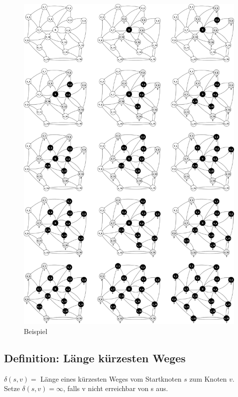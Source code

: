 \setlength{\headheight}{-50pt}
\vspace{-40pt}
\begin{figure}[H]
\centering
\includegraphics[width=0.9\linewidth]{16/Grafik/Diagramm}
\caption{Beispiel}
\label{fig:Diagramm}
\vspace{-80pt}
\end{figure}
\clearpage
\setlength{\headheight}{0pt}
\subsection{Definition: Länge kürzesten Weges}
$\delta(s,v)=$ Länge eines kürzesten Weges vom Startknoten $s$ zum Knoten $v$.\\
Setze $\delta(s,v)=\infty$, falls v nicht erreichbar von s aus.

